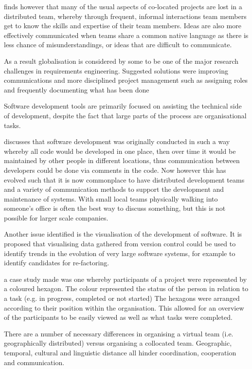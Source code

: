 \documentclass{l4proj}
\begin{document}
\citet{herbsleb07global} finds however that many of the usual aspects of co-located projects are lost in a distributed team, whereby through frequent, informal interactions team members get to know the skills and expertise of their team members.  Ideas are also more effectively communicated when teams share a common native language as there is less chance of misunderstandings, or ideas that are difficult to communicate.

As a result globalisation is considered by some to be one of the major research challenges in requirements engineering.  Suggested solutions were improving communications and more disciplined project management such as assigning roles and frequently documenting what has been done

Software development tools are primarily focused on assisting the technical side of development, despite the fact that large parts of the process are organisational tasks.

\citet{halverson06designing} discusses that software development was originally conducted in such a way whereby all code would be developed in one place, then over time it would be maintained by other people in different locations, thus communication between developers could be done via comments in the code.  Now however this has evolved such that it is now commonplace to have distributed development teams and a variety of communication methods to support the development and maintenance of systems.  With small local teams physically walking into someone's office is often the best way to discuss something, but this is not possible for larger scale companies.

Another issue identified is the visualisation of the development of software.  It is proposed that visualising data gathered from version control could be used to identify trends in the evolution of very large software systems, for example to identify candidates for re-factoring.  

a case study made was one whereby participants of a project were represented by a coloured hexagon.  The colour represented the status of the person in relation to a task (e.g. in progress, completed or not started)
The hexagons were arranged according to their position within the organisation.  This allowed for an overview of the participants to be easily viewed as well as what tasks were completed.

There are a number of necessary differences in organising a virtual team (i.e. geographically distributed) versus organising a collocated team.  Geographic, temporal, cultural and linguistic distance all hinder coordination, cooperation and communication. 
\end{document}
